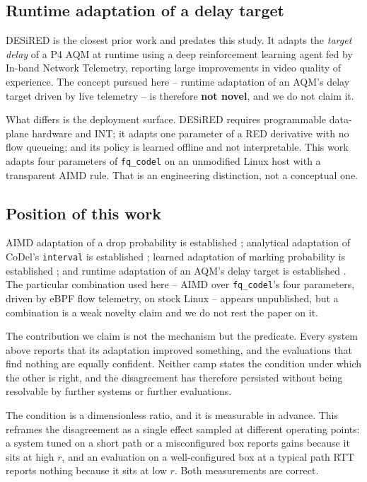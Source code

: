 \documentclass[conference]{IEEEtran}
\begin{document}
\subsection{Runtime adaptation of a delay target}

DESiRED \cite{desired2024} is the closest prior work and predates this study.
It adapts the \emph{target delay} of a P4 AQM at runtime using a deep
reinforcement learning agent fed by In-band Network Telemetry, reporting large
improvements in video quality of experience. The concept pursued here --
runtime adaptation of an AQM's delay target driven by live telemetry -- is
therefore \textbf{not novel}, and we do not claim it.

What differs is the deployment surface. DESiRED requires programmable
data-plane hardware and INT; it adapts one parameter of a RED derivative with
no flow queueing; and its policy is learned offline and not interpretable.
This work adapts four parameters of \texttt{fq\_codel} on an unmodified Linux
host with a transparent AIMD rule. That is an engineering distinction, not a
conceptual one.

\subsection{Position of this work}

AIMD adaptation of a drop probability is established \cite{ared2001};
analytical adaptation of CoDel's \texttt{interval} is established
\cite{yeleung2020}; learned adaptation of marking probability is established
\cite{queuepilot2023,aqmllm2025}; and runtime adaptation of an AQM's delay
target is established \cite{desired2024}. The particular combination used here
-- AIMD over \texttt{fq\_codel}'s four parameters, driven by eBPF flow
telemetry, on stock Linux -- appears unpublished, but a combination is a weak
novelty claim and we do not rest the paper on it.

The contribution we claim is not the mechanism but the predicate. Every system
above reports that its adaptation improved something, and the evaluations that
find nothing are equally confident. Neither camp states the condition under
which the other is right, and the disagreement has therefore persisted without
being resolvable by further systems or further evaluations.

The condition is a dimensionless ratio, and it is measurable in advance. This
reframes the disagreement as a single effect sampled at different operating
points: a system tuned on a short path or a misconfigured box reports gains
because it sits at high $r$, and an evaluation on a well-configured box at a
typical path RTT reports nothing because it sits at low $r$. Both measurements
are correct.
\end{document}

